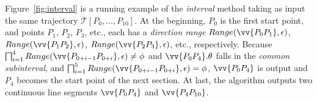 \begin{example}
	\label{exm-alg-interval}
	Figure~\ref{fig:interval} is a running example of the \emph{interval} method taking as input the same trajectory $\dddot{\mathcal{T}}[P_0, \ldots, P_{10}]$. At the beginning, $P_0$ is the first start point, and points $P_1$, $P_2$, $P_3$, etc., each has a \emph{direction range} $Range(\vv{P_0P_1}, \epsilon)$, $Range(\vv{P_1P_2}, \epsilon)$, $Range(\vv{P_2P_3}, \epsilon)$, etc., respectively.
	Because $\bigsqcap_{i=1}^{4}Range(\vv{P_{0+i-1}P_{0+i}}, \epsilon) \ne \phi$ and $\vv{P_0P_{4}}.\theta$ falls in the \emph{common subinterval}, and $\bigsqcap_{i=1}^{5}Range(\vv{P_{0+i-1}P_{0+i}}, \epsilon) = \phi$, $\vv{P_0P_4}$ is output and $P_4$ becomes the start point of the next section.
	At last, the algorithm outputs two continuous line segments $\vv{P_0P_4}$ and $\vv{P_4P_{10}}$.
\end{example}





